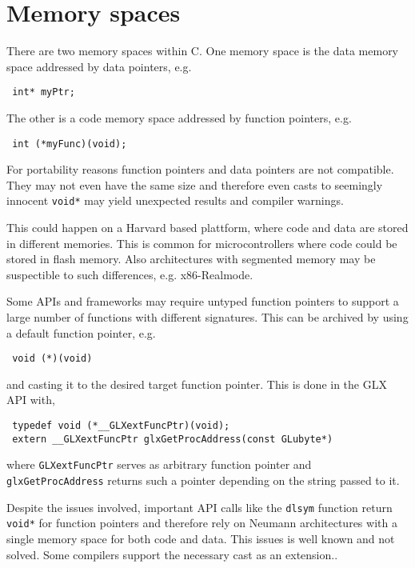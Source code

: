 \documentclass[12pt]{article}
\begin{document}
\section{Memory spaces}
There are two memory spaces within C. One memory space is the data memory space addressed by data pointers, e.g.
\begin{verbatim}
 int* myPtr;
\end{verbatim}
The other is a code memory space addressed by function pointers, e.g.
\begin{verbatim}
 int (*myFunc)(void);
\end{verbatim}

For portability reasons function pointers and data pointers are not compatible.
They may not even have the same size and therefore even casts to seemingly innocent
\texttt{void*} may yield unexpected results and compiler warnings.

This could happen on a Harvard based plattform, where code and data are stored in different
memories. This is common for microcontrollers where code could be stored in
flash memory.
Also architectures with segmented memory may be suspectible to such differences, e.g.
x86-Realmode.

Some APIs and frameworks may require untyped function pointers to support a large
number of functions with different signatures.
This can be archived by using a default function pointer, e.g.
\begin{verbatim}
 void (*)(void)
\end{verbatim}
and casting it to the desired target function pointer.
This is done in the GLX API\cite{glXGetProcAddressARB} with,
\begin{verbatim}
 typedef void (*__GLXextFuncPtr)(void);
 extern __GLXextFuncPtr glxGetProcAddress(const GLubyte*)
\end{verbatim}\cite{GLXMesa}
where \texttt{GLXextFuncPtr} serves as arbitrary function pointer and\\
\texttt{glxGetProcAddress} returns such a pointer depending on the string passed
to it.

Despite the issues involved, important API calls like the \texttt{dlsym}\cite{dlsym_opengroup} function return
\texttt{void*} for function pointers and therefore rely
on Neumann architectures with a single memory space for both code and data.
This issues is well known and not solved. Some compilers support the necessary
cast as an extension.\cite{Defects195}.
\end{document}
